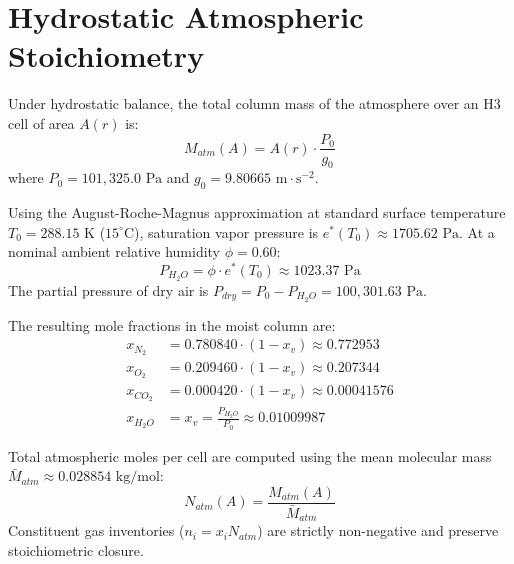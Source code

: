 \documentclass[10pt,journal,compsoc]{IEEEtran}
\begin{document}
\section{Hydrostatic Atmospheric Stoichiometry}
Under hydrostatic balance, the total column mass of the atmosphere over an H3 cell of area $A(r)$ is:
\begin{equation}
    M_{atm}(A) = A(r) \cdot \frac{P_0}{g_0}
\end{equation}
where $P_0 = 101,325.0 \text{ Pa}$ and $g_0 = 9.80665 \text{ m}\cdot\text{s}^{-2}$.

Using the August-Roche-Magnus approximation at standard surface temperature $T_0 = 288.15 \text{ K}$ ($15^\circ\text{C}$), saturation vapor pressure is $e^*(T_0) \approx 1705.62 \text{ Pa}$. At a nominal ambient relative humidity $\phi = 0.60$:
\begin{equation}
    P_{H_2O} = \phi \cdot e^*(T_0) \approx 1023.37 \text{ Pa}
\end{equation}
The partial pressure of dry air is $P_{dry} = P_0 - P_{H_2O} = 100,301.63 \text{ Pa}$. 

The resulting mole fractions in the moist column are:
\begin{align}
    x_{N_2} &= 0.780840 \cdot (1 - x_v) \approx 0.772953 \\
    x_{O_2} &= 0.209460 \cdot (1 - x_v) \approx 0.207344 \\
    x_{CO_2} &= 0.000420 \cdot (1 - x_v) \approx 0.00041576 \\
    x_{H_2O} &= x_v = \frac{P_{H_2O}}{P_0} \approx 0.01009987
\end{align}

Total atmospheric moles per cell are computed using the mean molecular mass $\bar{M}_{atm} \approx 0.028854 \text{ kg/mol}$:
\begin{equation}
    N_{atm}(A) = \frac{M_{atm}(A)}{\bar{M}_{atm}}
\end{equation}
Constituent gas inventories ($n_i = x_i N_{atm}$) are strictly non-negative and preserve stoichiometric closure.
\end{document}
